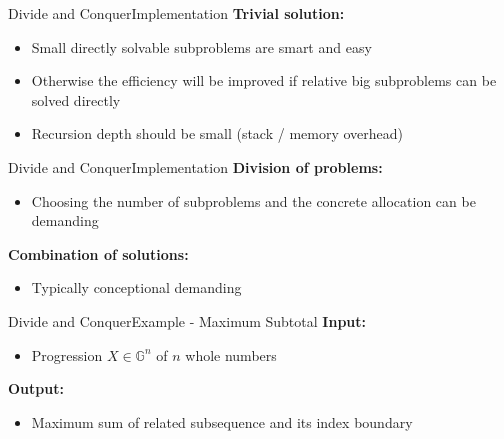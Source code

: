 \begin{frame}{Divide and Conquer}{Implementation}
  \textbf{Trivial solution:}
  \begin{itemize}
    \item
      Small directly solvable subproblems are smart and easy
    \item
      Otherwise the efficiency will be improved if relative big subproblems
      can be solved directly
    \item
      Recursion depth should be small (stack / memory overhead)
  \end{itemize}
\end{frame}


\begin{frame}{Divide and Conquer}{Implementation}
  \textbf{Division of problems:}
  \begin{itemize}
    \item
      Choosing the number of subproblems and the concrete allocation can be
      demanding
  \end{itemize}
  \vspace{1em}
  \textbf{Combination of solutions:}
  \begin{itemize}
    \item
      Typically conceptional demanding
  \end{itemize}
\end{frame}


\begin{frame}{Divide and Conquer}{Example - Maximum Subtotal}
  \textbf{Input:}
  \begin{itemize}
    \item
      Progression $X \in \mathbb{G}^n$ of $n$ whole numbers
  \end{itemize}
  \textbf{Output:}
  \begin{itemize}
    \item
      Maximum sum of related subsequence and its index boundary
  \end{itemize}
\end{frame}


